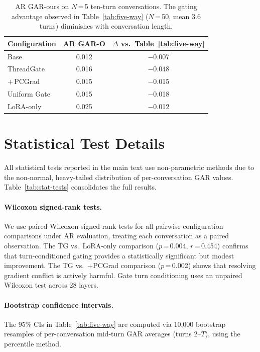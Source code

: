 \begin{table}[t]
\centering\small
\caption{AR GAR-ours on $N$\,=\,5 ten-turn conversations. The gating advantage observed in Table~\ref{tab:five-way} ($N$\,=\,50, mean 3.6 turns) diminishes with conversation length.}
\label{tab:n5-ar}
\begin{tabular}{lcc}
\toprule
\textbf{Configuration} & \textbf{AR GAR-O} & \textbf{$\Delta$ vs.\ Table~\ref{tab:five-way}} \\
\midrule
Base & 0.012 & $-$0.007 \\
\midrule
ThreadGate & 0.016 & $-$0.048 \\
\;+\,PCGrad & 0.015 & $-$0.015 \\
Uniform Gate & 0.015 & $-$0.018 \\
LoRA-only & 0.025 & $-$0.012 \\
\bottomrule
\end{tabular}
\end{table}

\section{Statistical Test Details}\label{sec:appendix-stats}

All statistical tests reported in the main text use non-parametric methods due to the non-normal, heavy-tailed distribution of per-conversation GAR values. Table~\ref{tab:stat-tests} consolidates the full results.

\paragraph{Wilcoxon signed-rank tests.} We use paired Wilcoxon signed-rank tests for all pairwise configuration comparisons under AR evaluation, treating each conversation as a paired observation. The TG vs.\ LoRA-only comparison ($p$\,=\,0.004, $r$\,=\,0.454) confirms that turn-conditioned gating provides a statistically significant but modest improvement. The TG vs.\ +PCGrad comparison ($p$\,=\,0.002) shows that resolving gradient conflict is actively harmful. Gate turn conditioning uses an unpaired Wilcoxon test across 28 layers.

\paragraph{Bootstrap confidence intervals.} The 95\% CIs in Table~\ref{tab:five-way} are computed via 10,000 bootstrap resamples of per-conversation mid-turn GAR averages (turns 2--$T$), using the percentile method.

